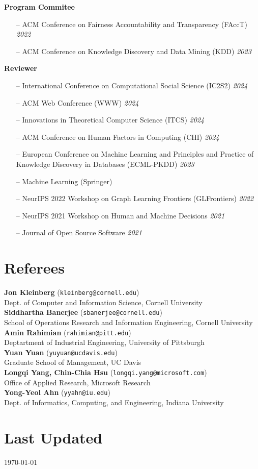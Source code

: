 \documentclass[margin]{res}
\newcommand{\field}[2]{\noindent \textbf{#1} \hfill #2 \\}
\newcommand{\referee}[3]{\textbf{#1} (\texttt{#3})\\{#2}\smallskip \\}
\begin{document}
\begin{resume}
	\field{Program Commitee}{}{
	\begin{itemize}[nosep]
		\item[--] ACM Conference on Fairness Accountability and Transparency (FAccT) \hfill \emph{2022}
		\item[--] ACM Conference on Knowledge Discovery and Data Mining (KDD) \hfill \emph{2023}
	\end{itemize}}
	\field{Reviewer}{}{ 
	\begin{itemize}[nosep]
		\item[--] International Conference on Computational Social Science (IC2S2) \hfill \emph{2024}
		\item[--] ACM Web Conference (WWW) \hfill \emph{2024}
		\item[--] Innovations in Theoretical Computer Science (ITCS) \hfill \emph{2024}
		\item[--] ACM Conference on Human Factors in Computing (CHI) \hfill \emph{2024}
		\item[--] European Conference on Machine Learning and Principles and Practice of Knowledge Discovery in Databases (ECML-PKDD) \hfill \emph{2023}
		\item[--] Machine Learning (Springer)
		\item[--] NeurIPS 2022 Workshop on Graph Learning Frontiers (GLFrontiers) \hfill \emph{2022}
		\item[--] NeurIPS 2021 Workshop on Human and Machine Decisions \hfill \emph{2021} 
		\item[--] Journal of Open Source Software \hfill \emph{2021}
	\end{itemize}}
	
\section{Referees} \referee{Jon Kleinberg}{Dept. of Computer and Information Science, Cornell University}{kleinberg@cornell.edu}
\referee{Siddhartha Banerjee}{School of Operations Research and Information Engineering, Cornell University}{sbanerjee@cornell.edu}
\referee{Amin Rahimian}{Deptartment of Industrial Engineering, University of Pittsburgh}{rahimian@pitt.edu}
\referee{Yuan Yuan}{Graduate School of Management, UC Davis}{yuyuan@ucdavis.edu}
\referee{Longqi Yang, Chin-Chia Hsu}{Office of Applied Research, Microsoft Research}{longqi.yang@microsoft.com}
\referee{Yong-Yeol Ahn}{Dept. of Informatics, Computing, and Engineering, Indiana University}{yyahn@iu.edu}

 \section{Last Updated} \today


\end{resume}
\end{document}
